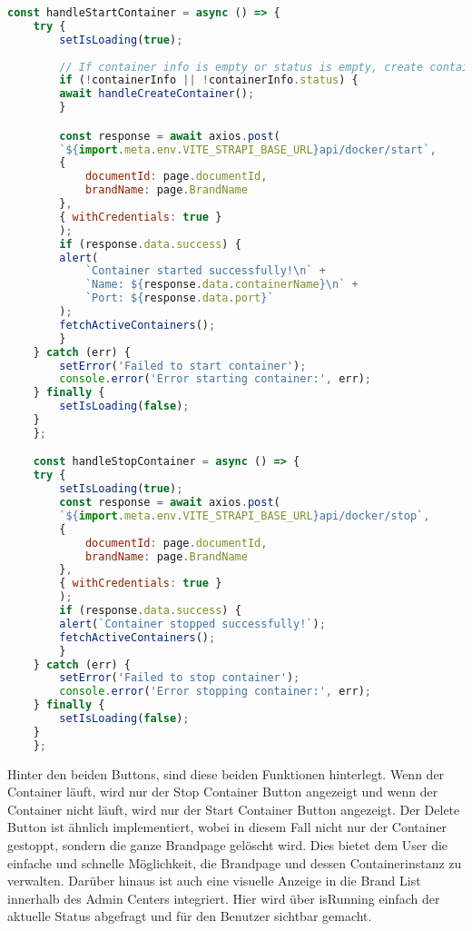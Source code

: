 \begin{lstlisting}[language=JavaScript, caption={branditem.jsx Start/Stop Container-Funktionen}, label={lst:branditemjsxStartStopContainer}]
const handleStartContainer = async () => {
    try {
        setIsLoading(true);
        
        // If container info is empty or status is empty, create container first
        if (!containerInfo || !containerInfo.status) {
        await handleCreateContainer();
        }

        const response = await axios.post(
        `${import.meta.env.VITE_STRAPI_BASE_URL}api/docker/start`,
        { 
            documentId: page.documentId,
            brandName: page.BrandName
        },
        { withCredentials: true }
        );
        if (response.data.success) {
        alert(
            `Container started successfully!\n` +
            `Name: ${response.data.containerName}\n` +
            `Port: ${response.data.port}`
        );
        fetchActiveContainers();
        }
    } catch (err) {
        setError('Failed to start container');
        console.error('Error starting container:', err);
    } finally {
        setIsLoading(false);
    }
    };

    const handleStopContainer = async () => {
    try {
        setIsLoading(true);
        const response = await axios.post(
        `${import.meta.env.VITE_STRAPI_BASE_URL}api/docker/stop`,
        { 
            documentId: page.documentId,
            brandName: page.BrandName
        },
        { withCredentials: true }
        );
        if (response.data.success) {
        alert(`Container stopped successfully!`);
        fetchActiveContainers();
        }
    } catch (err) {
        setError('Failed to stop container');
        console.error('Error stopping container:', err);
    } finally {
        setIsLoading(false);
    }
    };
\end{lstlisting}

Hinter den beiden Buttons, sind diese beiden Funktionen hinterlegt. Wenn der Container läuft, wird nur der Stop Container Button angezeigt und wenn der Container nicht läuft, wird nur der Start Container Button angezeigt. Der Delete Button ist ähnlich implementiert, wobei in diesem Fall nicht nur der Container gestoppt, sondern die ganze Brandpage gelöscht wird. Dies bietet dem User die einfache und schnelle Möglichkeit, die Brandpage und dessen Containerinstanz zu verwalten.
Darüber hinaus ist auch eine visuelle Anzeige in die Brand List innerhalb des Admin Centers integriert. Hier wird über isRunning einfach der aktuelle Status abgefragt und für den Benutzer sichtbar gemacht.